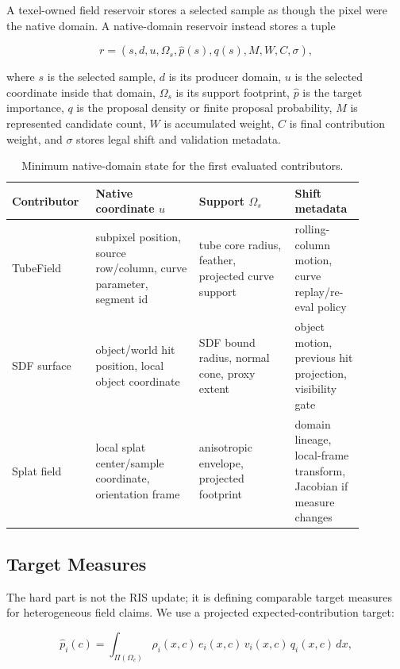 \documentclass[11pt]{article}
\newcommand{\Target}{\hat{p}}
\newcommand{\Pdf}{q}
\newcommand{\WeightSum}{W}
\begin{document}
A texel-owned field reservoir stores a selected sample as though the pixel were
the native domain.  A native-domain reservoir instead stores a tuple

\begin{equation}
  r = (s, d, u, \Omega_s, \Target(s), \Pdf(s), M, \WeightSum, C, \sigma),
\end{equation}

where \(s\) is the selected sample, \(d\) is its producer domain, \(u\) is the
selected coordinate inside that domain, \(\Omega_s\) is its support footprint,
\(\Target\) is the target importance, \(\Pdf\) is the proposal density or
finite proposal probability, \(M\) is represented candidate count,
\(\WeightSum\) is accumulated weight, \(C\) is final contribution weight, and
\(\sigma\) stores legal shift and validation metadata.

\begin{table}[t]
\centering
\begin{tabular}{p{0.18\linewidth}p{0.27\linewidth}p{0.25\linewidth}p{0.18\linewidth}}
\toprule
Contributor & Native coordinate \(u\) & Support \(\Omega_s\) & Shift metadata \\
\midrule
TubeField & subpixel position, source row/column, curve parameter, segment id
& tube core radius, feather, projected curve support
& rolling-column motion, curve replay/re-eval policy \\
SDF surface & object/world hit position, local object coordinate
& SDF bound radius, normal cone, proxy extent
& object motion, previous hit projection, visibility gate \\
Splat field & local splat center/sample coordinate, orientation frame
& anisotropic envelope, projected footprint
& domain lineage, local-frame transform, Jacobian if measure changes \\
\bottomrule
\end{tabular}
\caption{Minimum native-domain state for the first evaluated contributors.}
\label{tab:sample-contract}
\end{table}

\subsection{Target Measures}

The hard part is not the RIS update; it is defining comparable target measures
for heterogeneous field claims.  We use a projected expected-contribution
target:

\begin{equation}
  \Target_i(c) =
    \int_{\Pi(\Omega_c)}
      \rho_i(x,c)\,
      e_i(x,c)\,
      v_i(x,c)\,
      q_i(x,c)\,dx,
\end{equation}
\end{document}
